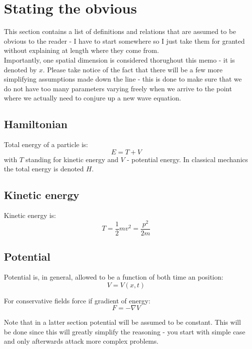 \documentclass[12pt]{article}
\begin{document}
\section{Stating the obvious}
This section contains a list of definitions and relations that are assumed to be obvious to the reader - I have to start somewhere so I just take them for granted without explaining at length where they come from.
\\ \indent Importantly, one spatial dimension is considered thorughout this memo - it is denoted by $x$. Please take notice of the fact that there will 
be a few more simplifying assumptions made down the line - this is done 
to make sure that we do not have too many parameters varying freely when 
we arrive to the point where we actually need to conjure up a new wave equation.
\subsection{Hamiltonian}
Total energy of a particle is:
\begin{equation}\label{total_energy}
E = T + V
\end{equation}
with $T$ standing for kinetic energy and $V$ - potential energy. In classical mechanics the total energy is denoted $H$.

\subsection{Kinetic energy}
Kinetic energy is:
\begin{equation}\label{kinetic_energy}
T = \frac{1}{2}mv^2 = \frac{p^2}{2m}
\end{equation}

\subsection{Potential}
Potential is, in general, allowed to be a function of both time an position:
\begin{equation}
V = V(x, t)
\end{equation}

For conservative fields force if gradient of energy:
\begin{equation}\label{force_grad_potential}
F = - \nabla V
\end{equation}

Note that in a latter section potential will be assumed to be constant.
This will be done since this will greatly simplify the reasoning - you
start with simple case and only afterwards attack more complex problems.
\end{document}
